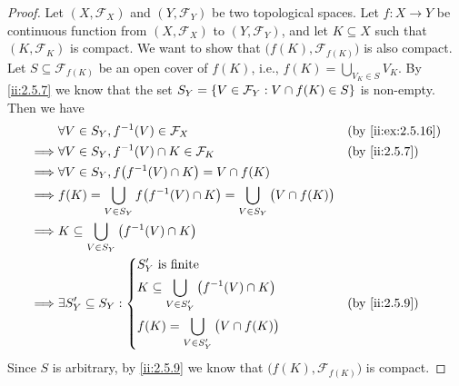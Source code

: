 \begin{proof}
  Let \((X, \mathcal{F}_X)\) and \((Y, \mathcal{F}_Y)\) be two topological spaces.
  Let \(f : X \to Y\) be continuous function from \((X, \mathcal{F}_X)\) to \((Y, \mathcal{F}_Y)\), and let \(K \subseteq X\) such that \((K, \mathcal{F}_K)\) is compact.
  We want to show that \(\big(f(K), \mathcal{F}_{f(K)}\big)\) is also compact.
  Let \(S \subseteq \mathcal{F}_{f(K)}\) be an open cover of \(f(K)\), i.e., \(f(K) = \bigcup_{V_K \in S} V_K\).
  By \cref{ii:2.5.7} we know that the set \(S_Y = \left\lbrace V \in \mathcal{F}_Y : V \cap f(K) \in S\right\rbrace\) is non-empty.
  Then we have
  \begin{align*}
             & \forall V \in S_Y, f^{-1}(V) \in \mathcal{F}_X                                                     &  & \by{ii:ex:2.5.16} \\
    \implies & \forall V \in S_Y, f^{-1}(V) \cap K \in \mathcal{F}_K                                              &  & \by{ii:2.5.7}     \\
    \implies & \forall V \in S_Y, f\big(f^{-1}(V) \cap K\big) = V \cap f(K)                                                           \\
    \implies & f(K) = \bigcup_{V \in S_Y} f\big(f^{-1}(V) \cap K\big) = \bigcup_{V \in S_Y} \big(V \cap f(K)\big)                     \\
    \implies & K \subseteq \bigcup_{V \in S_Y} \big(f^{-1}(V) \cap K\big)                                                             \\
    \implies & \exists S_Y' \subseteq S_Y : \begin{dcases}
                                              S_Y' \text{ is finite}                                      \\
                                              K \subseteq \bigcup_{V \in S_Y'} \big(f^{-1}(V) \cap K\big) \\
                                              f(K) = \bigcup_{V \in S_Y'} \big(V \cap f(K)\big)
                                            \end{dcases}                                     &  & \by{ii:2.5.9}                          \\
  \end{align*}
  Since \(S\) is arbitrary, by \cref{ii:2.5.9} we know that \(\big(f(K), \mathcal{F}_{f(K)}\big)\) is compact.


\end{proof}
